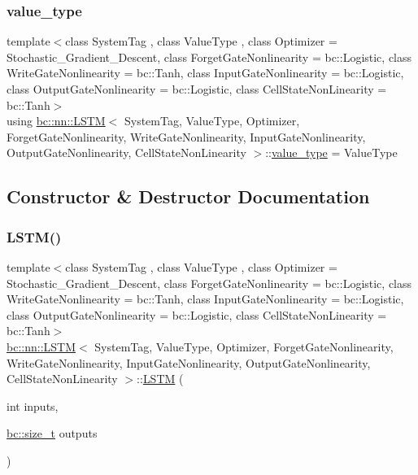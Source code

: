 \mbox{\label{structbc_1_1nn_1_1LSTM_a4f4948a22b62ff7975968bb2d38e79a2}} 
\subsubsection{\texorpdfstring{value\+\_\+type}{value\_type}}
{\footnotesize\ttfamily template$<$class System\+Tag , class Value\+Type , class Optimizer  = Stochastic\+\_\+\+Gradient\+\_\+\+Descent, class Forget\+Gate\+Nonlinearity  = bc\+::\+Logistic, class Write\+Gate\+Nonlinearity  = bc\+::\+Tanh, class Input\+Gate\+Nonlinearity  = bc\+::\+Logistic, class Output\+Gate\+Nonlinearity  = bc\+::\+Logistic, class Cell\+State\+Non\+Linearity  = bc\+::\+Tanh$>$ \\
using \hyperlink{structbc_1_1nn_1_1LSTM}{bc\+::nn\+::\+L\+S\+TM}$<$ System\+Tag, Value\+Type, Optimizer, Forget\+Gate\+Nonlinearity, Write\+Gate\+Nonlinearity, Input\+Gate\+Nonlinearity, Output\+Gate\+Nonlinearity, Cell\+State\+Non\+Linearity $>$\+::\hyperlink{structbc_1_1nn_1_1LSTM_a4f4948a22b62ff7975968bb2d38e79a2}{value\+\_\+type} =  Value\+Type}



\subsection{Constructor \& Destructor Documentation}
\mbox{\label{structbc_1_1nn_1_1LSTM_acd8abe2e403ae4f8806b2a95d909a62a}} 
\subsubsection{\texorpdfstring{L\+S\+T\+M()}{LSTM()}}
{\footnotesize\ttfamily template$<$class System\+Tag , class Value\+Type , class Optimizer  = Stochastic\+\_\+\+Gradient\+\_\+\+Descent, class Forget\+Gate\+Nonlinearity  = bc\+::\+Logistic, class Write\+Gate\+Nonlinearity  = bc\+::\+Tanh, class Input\+Gate\+Nonlinearity  = bc\+::\+Logistic, class Output\+Gate\+Nonlinearity  = bc\+::\+Logistic, class Cell\+State\+Non\+Linearity  = bc\+::\+Tanh$>$ \\
\hyperlink{structbc_1_1nn_1_1LSTM}{bc\+::nn\+::\+L\+S\+TM}$<$ System\+Tag, Value\+Type, Optimizer, Forget\+Gate\+Nonlinearity, Write\+Gate\+Nonlinearity, Input\+Gate\+Nonlinearity, Output\+Gate\+Nonlinearity, Cell\+State\+Non\+Linearity $>$\+::\hyperlink{structbc_1_1nn_1_1LSTM}{L\+S\+TM} (\begin{DoxyParamCaption}\item[{int}]{inputs,  }\item[{\hyperlink{namespacebc_aaf8e3fbf99b04b1b57c4f80c6f55d3c5}{bc\+::size\+\_\+t}}]{outputs }\end{DoxyParamCaption})\hspace{0.3cm}{\ttfamily [inline]}}



